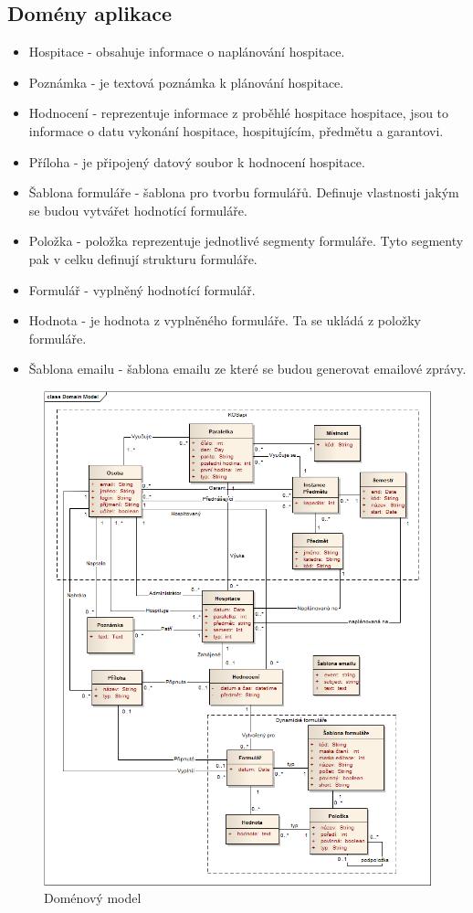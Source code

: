 \subsection{Domény aplikace}
\begin{itemize}
\item Hospitace - obsahuje informace o naplánování hospitace. 
\item Poznámka - je textová poznámka k plánování hospitace.
\item Hodnocení - reprezentuje informace z proběhlé hospitace hospitace, jsou to informace o datu vykonání hospitace, hospitujícím, předmětu a garantovi.
\item Příloha - je připojený datový soubor k hodnocení hospitace.
\item Šablona formuláře - šablona pro tvorbu formulářů. Definuje vlastnosti jakým se budou vytvářet hodnotící formuláře.
\item Položka - položka reprezentuje jednotlivé segmenty formuláře. Tyto segmenty pak v celku definují strukturu formuláře.
\item Formulář - vyplněný hodnotící formulář.
\item Hodnota - je hodnota z vyplněného formuláře. Ta se ukládá z položky formuláře.
\item Šablona emailu - šablona emailu ze které se budou generovat emailové zprávy.
\end{itemize}

\begin{figure}[p]
\begin{center}
\includegraphics[width=14cm]{figures/DomainModel2}
\caption{Doménový model}
\label{fig:domainmodel}
\end{center}
\end{figure}


